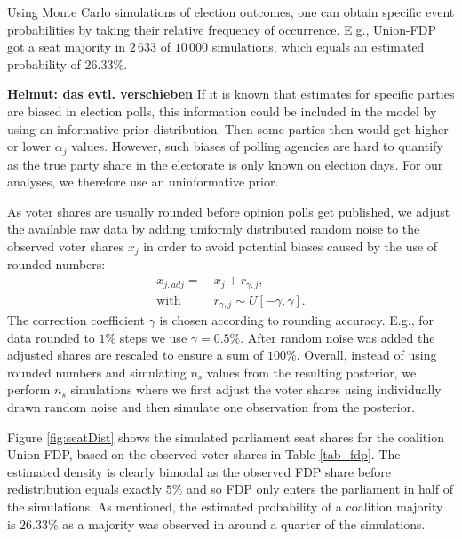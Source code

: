 \documentclass[smallcondensed]{svjour3}     %
\begin{document}
Using Monte Carlo simulations of election outcomes, one can obtain
specific event probabilities by taking their relative frequency of
occurrence. E.g., Union-FDP got a seat majority
in $2\,633$ of $10\,000$ simulations, which equals an estimated
probability of $26.33\%$.

{\bf Helmut: das evtl. verschieben} If it is known that estimates for specific parties are biased in election polls, this information
could be included in the model by using an informative prior distribution.
Then some  parties then would get higher or lower
$\alpha_j$ values. 
However, such biases of polling agencies are hard to quantify
as the true party share in the electorate is only known on election days.
For our analyses, we therefore use an uninformative prior.

As voter shares are usually rounded before opinion polls get published,
we adjust the available raw data
by adding uniformly distributed random noise to the
observed voter shares $x_j$ in order to avoid potential biases caused
by the use of rounded numbers:
\begin{equation}
\begin{aligned}
x_{j,adj} = \ &x_j + r_{\gamma,j}, \\
\text{with} \ \ \ \ \ &r_{\gamma,j} \sim U[-\gamma,\gamma].
\end{aligned}
\end{equation}
The correction coefficient $\gamma$ is chosen according to
rounding accuracy.
E.g., for data rounded to $1\%$ steps we use $\gamma = 0.5\%$.
After random noise was added the adjusted shares are rescaled to
ensure a sum of $100\%$. Overall, instead of using rounded numbers
and simulating $n_s$ values from the resulting posterior, we perform
$n_s$ simulations where
we first adjust the voter shares using individually drawn random noise
and then simulate one observation from the posterior.


Figure \ref{fig:seatDist} shows the simulated
parliament seat shares for the coalition Union-FDP, based on the observed
voter shares in Table \ref{tab_fdp}. The estimated density is clearly bimodal
as the observed FDP share before redistribution equals exactly $5\%$ and
so FDP only enters the parliament in half of the simulations. As mentioned,
the estimated probability of a coalition majority is $26.33\%$ as
a majority was observed in around a quarter of the simulations.
\end{document}
